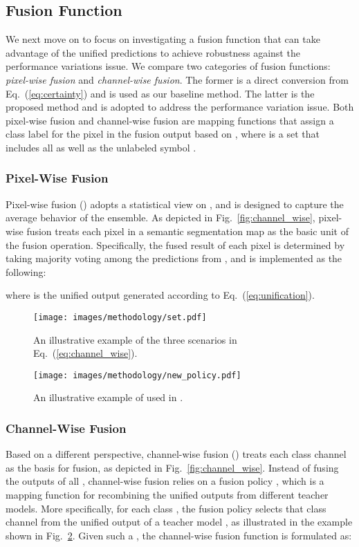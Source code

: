 \documentclass[final]{cvpr}
\begin{document}
 \subsection{Fusion Function}
\label{sec:method:fusion_function}
We next move on to focus on investigating a fusion function that can take advantage of the unified predictions to achieve  robustness against the performance variations issue. We compare two categories of fusion functions: \textit{pixel-wise fusion} and \textit{channel-wise fusion}. The former is a direct conversion from Eq.~(\ref{eq:certainty}) and is used as our baseline method. The latter is the proposed method and is adopted to address the performance variation issue. Both pixel-wise fusion and channel-wise fusion are mapping functions  that assign a class label  for the pixel  in the fusion output based on , where  is a set that includes all  as well as the unlabeled symbol .

\subsubsection{Pixel-Wise Fusion}
Pixel-wise fusion () adopts a statistical view on , and is designed to capture the average behavior of the ensemble. As depicted in Fig.~\ref{fig:channel_wise}, pixel-wise fusion treats each pixel in a semantic segmentation map as the basic unit of the fusion operation. Specifically, the fused result of each pixel is determined by taking majority voting among the predictions from , and is implemented as the following:

 where  is the unified output generated according to Eq.~(\ref{eq:unification}).

\begin{figure}[t]
    \texttt{[image: images/methodology/set.pdf]}
    \caption{An illustrative example of the three scenarios in Eq.~(\ref{eq:channel_wise}).}
    \label{fig:set}
\end{figure}
 \begin{figure}[t]
    \texttt{[image: images/methodology/new\_policy.pdf]}
    \caption{An illustrative example of  used in .}
    \label{fig:policy}
\end{figure}

 \subsubsection{Channel-Wise Fusion}
Based on a different perspective, channel-wise fusion () treats each class channel as the basis for fusion, as depicted in Fig.~\ref{fig:channel_wise}. Instead of fusing the outputs of all , channel-wise fusion relies on a fusion policy , which is a mapping function for recombining the unified outputs from different teacher models. More specifically, for each class , the fusion policy  selects that class channel from the unified output  of a teacher model , as illustrated in the example shown in Fig.~\ref{fig:policy}.
Given such a , the channel-wise fusion function is formulated as:
\end{document}
